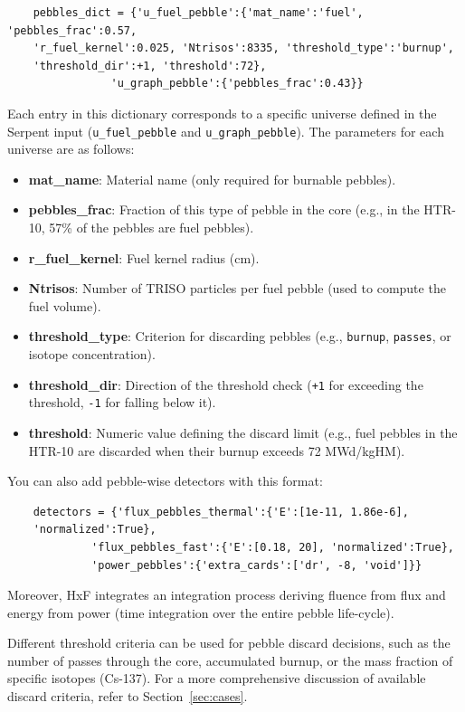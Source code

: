 \documentclass{article}
\begin{document}
\begin{verbatim}
    pebbles_dict = {'u_fuel_pebble':{'mat_name':'fuel', 'pebbles_frac':0.57,
    'r_fuel_kernel':0.025, 'Ntrisos':8335, 'threshold_type':'burnup',
    'threshold_dir':+1, 'threshold':72},
                'u_graph_pebble':{'pebbles_frac':0.43}}
\end{verbatim}

Each entry in this dictionary corresponds to a specific universe defined in the Serpent input (\texttt{u\_fuel\_pebble} and \texttt{u\_graph\_pebble}). The parameters for each universe are as follows:

\begin{itemize}
    \item \textbf{mat\_name}: Material name (only required for burnable pebbles).
    \item \textbf{pebbles\_frac}: Fraction of this type of pebble in the core (e.g., in the HTR-10, 57\% of the pebbles are fuel pebbles).
    \item \textbf{r\_fuel\_kernel}: Fuel kernel radius (cm).
    \item \textbf{Ntrisos}: Number of TRISO particles per fuel pebble (used to compute the fuel volume).
    \item \textbf{threshold\_type}: Criterion for discarding pebbles (e.g., \texttt{burnup}, \texttt{passes}, or isotope concentration).
    \item \textbf{threshold\_dir}: Direction of the threshold check (\texttt{+1} for exceeding the threshold, \texttt{-1} for falling below it).
    \item \textbf{threshold}: Numeric value defining the discard limit (e.g., fuel pebbles in the HTR-10 are discarded when their burnup exceeds 72 MWd/kgHM).
\end{itemize}

You can also add pebble-wise detectors with this format: 
\begin{verbatim}
    detectors = {'flux_pebbles_thermal':{'E':[1e-11, 1.86e-6],
    'normalized':True},
             'flux_pebbles_fast':{'E':[0.18, 20], 'normalized':True},
             'power_pebbles':{'extra_cards':['dr', -8, 'void']}}
\end{verbatim}

Moreover, HxF integrates an integration process deriving fluence from flux and energy from power (time integration over the entire pebble life-cycle).

Different threshold criteria can be used for pebble discard decisions, such as the number of passes through the core, accumulated burnup, or the mass fraction of specific isotopes (Cs-137). For a more comprehensive discussion of available discard criteria, refer to Section~\ref{sec:cases}.
\end{document}

